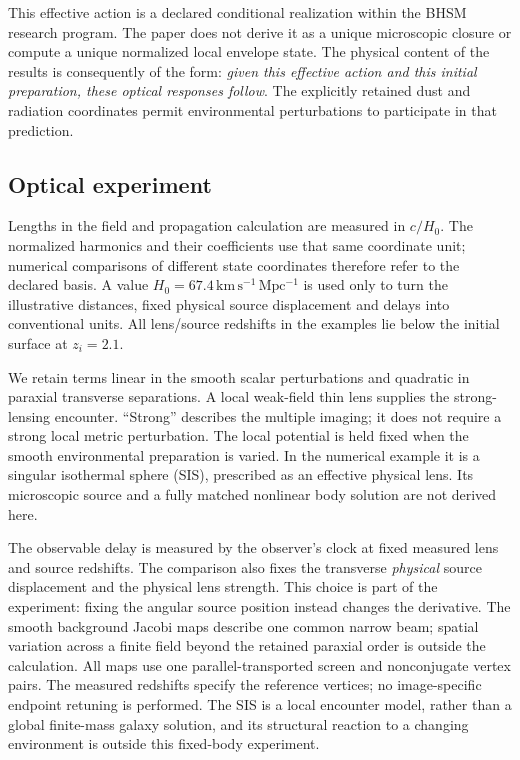\documentclass[11pt,a4paper]{article}
\begin{document}
This effective action is a declared conditional realization within the
BHSM research program. The paper does not derive it as a unique
microscopic closure or compute a unique normalized local envelope state.
The physical content of the results is consequently of the form:
\emph{given this effective action and this initial preparation, these
optical responses follow}. The explicitly retained dust and radiation
coordinates permit environmental perturbations to participate in that
prediction.

\subsection{Optical experiment}

Lengths in the field and propagation calculation are measured in $c/H_0$.
The normalized harmonics and their coefficients use that same coordinate
unit; numerical comparisons of different state coordinates therefore
refer to the declared basis. A value $H_0=67.4\,
\mathrm{km\,s^{-1}\,Mpc^{-1}}$ is used only to turn the illustrative
distances, fixed physical source displacement and delays into conventional
units. All lens/source redshifts in the examples lie below the initial
surface at $z_i=2.1$.

We retain terms linear in the smooth scalar perturbations and quadratic
in paraxial transverse separations. A local weak-field thin lens supplies
the strong-lensing encounter. ``Strong'' describes the multiple imaging;
it does not require a strong local metric perturbation. The local
potential is held fixed when the smooth environmental preparation is
varied. In the numerical example it is a singular isothermal sphere
(SIS), prescribed as an effective physical lens. Its microscopic source
and a fully matched nonlinear body solution are not derived here.

The observable delay is measured by the observer's clock at fixed
measured lens and source redshifts. The comparison also fixes the
transverse \emph{physical} source displacement and the physical lens
strength. This choice is part of the experiment: fixing the angular
source position instead changes the derivative. The smooth background
Jacobi maps describe one common narrow beam; spatial variation across a
finite field beyond the retained paraxial order is outside the calculation.
All maps use one parallel-transported screen and nonconjugate vertex
pairs. The measured redshifts specify the reference vertices; no
image-specific endpoint retuning is performed. The SIS is a local
encounter model, rather than a global finite-mass galaxy solution, and
its structural reaction to a changing environment is outside this
fixed-body experiment.
\end{document}
